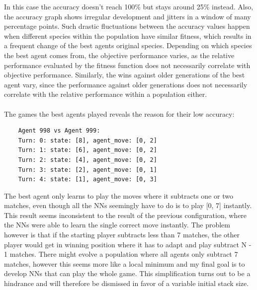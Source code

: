 \documentclass[11pt]{report}
\begin{document}
\begin{enumerate}
\begin{center}
        \begin{center}
        \end{center}
    \end{center}
    In this case the accuracy doesn't reach 100\% but stays around 25\% instead.
    Also, the accuracy graph shows irregular development and jitters in a window of many percentage points.
    Such drastic fluctuations between the accuracy values happen when different species within the population have similar fitness, which results in a frequent change of the best agents original species.
    Depending on which species the best agent comes from, the objective performance varies, as the relative performance evaluated by the fitness function does not necessarily correlate with objective performance.
    Similarly, the wins against older generations of the best agent vary, since the performance against older generations does not necessarily correlate with the relative performance within a population either.
    \\ \\
    The games the best agents played reveals the reason for their low accuracy:
    \begin{verbatim}
    Agent 998 vs Agent 999:
    Turn: 0: state: [8], agent_move: [0, 2]
    Turn: 1: state: [6], agent_move: [0, 2]
    Turn: 2: state: [4], agent_move: [0, 2]
    Turn: 3: state: [2], agent_move: [0, 1]
    Turn: 4: state: [1], agent_move: [0, 3]
    \end{verbatim}
    The best agent only learns to play the moves where it subtracts one or two matches, even though all the NNs seemingly have to do is to play [0, 7] instantly.
    This result seems inconsistent to the result of the previous configuration, where the NNs were able to learn the single correct move instantly.
    The problem however is that if the starting player subtracts less than 7 matches, the other player would get in winning position where it has to adapt and play subtract N - 1 matches.
    There might evolve a population where all agents only subtract 7 matches, however this seems more like a local minimum and my final goal is to develop NNs that can play the whole game.
    This simplification turns out to be a hindrance and will therefore be dismissed in favor of a variable initial stack size.


\end{enumerate}
\end{document}
